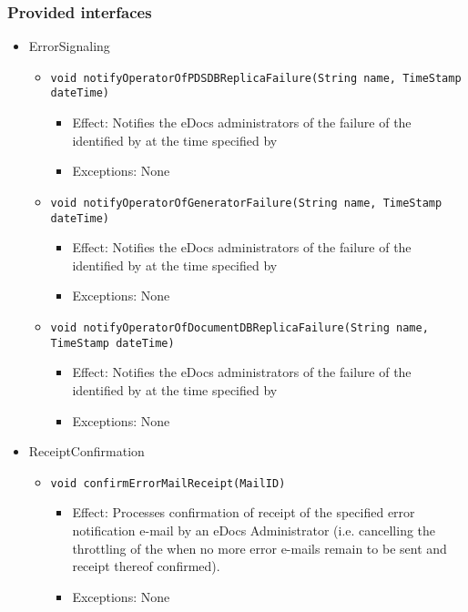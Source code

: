 \subsubsection*{Provided interfaces}
\begin{itemize}
    \item ErrorSignaling
    \begin{itemize}
        \item \texttt{void notifyOperatorOfPDSDBReplicaFailure(String name, TimeStamp dateTime)}
        \begin{itemize}
            \item Effect: Notifies the eDocs administrators of the failure of the  identified by  at the time specified by 
            \item Exceptions: None
        \end{itemize}

        \item \texttt{void notifyOperatorOfGeneratorFailure(String name, TimeStamp dateTime)}
        \begin{itemize}
            \item Effect: Notifies the eDocs administrators of the failure of the  identified by  at the time specified by 
            \item Exceptions: None
        \end{itemize}

		\item \texttt{void notifyOperatorOfDocumentDBReplicaFailure(String name, TimeStamp dateTime)}
        \begin{itemize}
            \item Effect: Notifies the eDocs administrators of the failure of the  identified by  at the time specified by 
            \item Exceptions: None
        \end{itemize}
    \end{itemize}

	\item ReceiptConfirmation
    \begin{itemize}
        \item \texttt{void confirmErrorMailReceipt(MailID)}
        \begin{itemize}
            \item Effect: Processes confirmation of receipt of the specified error notification e-mail by an eDocs Administrator (i.e. cancelling the throttling of the  when no more error e-mails remain to be sent and receipt thereof confirmed).
            \item Exceptions: None
        \end{itemize}
    \end{itemize}
\end{itemize}

